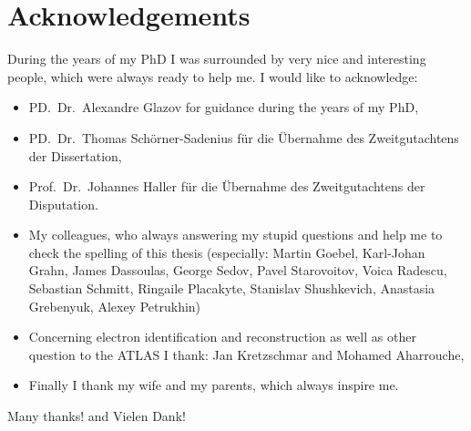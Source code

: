 \documentclass[oneside,11pt]{Classes/PhDthesisPSnPDF}
\begin{document}
\section*{Acknowledgements}

During the years of my PhD I was surrounded by very nice and interesting people, which were always ready to help me. I would like to acknowledge:

\begin{itemize}
\item PD.~Dr.~Alexandre Glazov for guidance during the years of my PhD,
\item PD.~Dr.~Thomas Sch\"orner-Sadenius f\"ur die \"Ubernahme des Zweitgutachtens der Dissertation,
\item Prof.~Dr.~Johannes Haller f\"ur die \"Ubernahme des Zweitgutachtens der Disputation.
\item My colleagues, who always answering my stupid questions and help me to check the spelling of this thesis (especially: Martin Goebel,  Karl-Johan Grahn, James Dassoulas, George Sedov, Pavel Starovoitov, Voica Radescu, Sebastian Schmitt, Ringaile Placakyte, Stanislav Shushkevich, Anastasia Grebenyuk, Alexey Petrukhin)
\item Concerning electron identification and reconstruction as well as other question to the ATLAS I thank: Jan Kretzschmar and Mohamed Aharrouche,
\item Finally I thank my wife and my parents, which always inspire me.
\end{itemize}
Many thanks! and Vielen Dank! 
\end{document}
